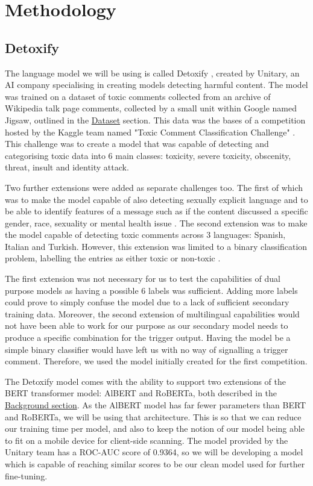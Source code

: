 \chapter{Methodology}

\section{Detoxify}
\label{sec:Detoxify}

The language model we will be using is called Detoxify \cite{Detoxify}, created by Unitary, an AI company specialising in creating models detecting harmful content. The model was trained on a dataset of toxic comments collected from an archive of Wikipedia talk page comments, collected by a small unit within Google named Jigsaw, outlined in the \hyperref[sec:JigsawDataset]{Dataset} section. This data was the bases of a competition hosted by the Kaggle team named "Toxic Comment Classification Challenge" \cite{jigsaw-comp1}. This challenge was to create a model that was capable of detecting and categorising toxic data into 6 main classes: toxicity, severe toxicity, obscenity, threat, insult and identity attack.

Two further extensions were added as separate challenges too. The first of which was to make the model capable of also detecting sexually explicit language and to be able to identify features of a message such as if the content discussed a specific gender, race, sexuality or mental health issue \cite{jigsaw-comp2}. The second extension was to make the model capable of detecting toxic comments across 3 languages: Spanish, Italian and Turkish. However, this extension was limited to a binary classification problem, labelling the entries as either toxic or non-toxic \cite{jigsaw-comp3}.

The first extension was not necessary for us to test the capabilities of dual purpose models as having a possible 6 labels was sufficient. Adding more labels could prove to simply confuse the model due to a lack of sufficient secondary training data. Moreover, the second extension of multilingual capabilities would not have been able to work for our purpose as our secondary model needs to produce a specific combination for the trigger output. Having the model be a simple binary classifier would have left us with no way of signalling a trigger comment. Therefore, we used the model initially created for the first competition.

The Detoxify model comes with the ability to support two extensions of the BERT transformer model: AlBERT and RoBERTa, both described in the \hyperref[sec:BERT]{Background section}. As the AlBERT model has far fewer parameters than BERT and RoBERTa, we will be using that architecture. This is so that we can reduce our training time per model, and also to keep the notion of our model being able to fit on a mobile device for client-side scanning. The model provided by the Unitary team has a ROC-AUC score of 0.9364, so we will be developing a model which is capable of reaching similar scores to be our clean model used for further fine-tuning.

